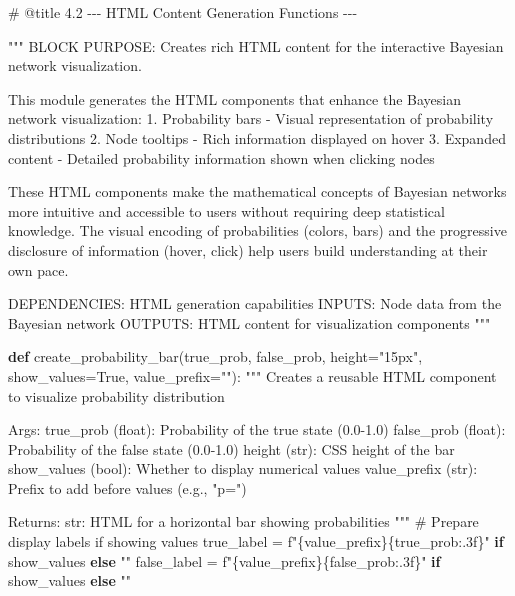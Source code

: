 \documentclass[
  11pt,
  letterpaper,
]{book}
\newenvironment{Shaded}{\begin{snugshade}}{\end{snugshade}}
\newcommand{\CommentTok}[1]{\textcolor[rgb]{0.37,0.37,0.37}{#1}}
\newcommand{\ControlFlowTok}[1]{\textcolor[rgb]{0.00,0.23,0.31}{\textbf{#1}}}
\newcommand{\KeywordTok}[1]{\textcolor[rgb]{0.00,0.23,0.31}{\textbf{#1}}}
\newcommand{\NormalTok}[1]{\textcolor[rgb]{0.00,0.23,0.31}{#1}}
\newcommand{\OperatorTok}[1]{\textcolor[rgb]{0.37,0.37,0.37}{#1}}
\newcommand{\SpecialCharTok}[1]{\textcolor[rgb]{0.37,0.37,0.37}{#1}}
\newcommand{\SpecialStringTok}[1]{\textcolor[rgb]{0.13,0.47,0.30}{#1}}
\newcommand{\StringTok}[1]{\textcolor[rgb]{0.13,0.47,0.30}{#1}}
\newcommand{\VariableTok}[1]{\textcolor[rgb]{0.07,0.07,0.07}{#1}}
\begin{document}
\begin{Shaded}
\begin{Highlighting}[]
\CommentTok{\# @title 4.2 {-}{-}{-} HTML Content Generation Functions {-}{-}{-}}

\CommentTok{"""}
\CommentTok{BLOCK PURPOSE: Creates rich HTML content for the interactive Bayesian network visualization.}

\CommentTok{This module generates the HTML components that enhance the Bayesian network visualization:}
\CommentTok{1. Probability bars {-} Visual representation of probability distributions}
\CommentTok{2. Node tooltips {-} Rich information displayed on hover}
\CommentTok{3. Expanded content {-} Detailed probability information shown when clicking nodes}

\CommentTok{These HTML components make the mathematical concepts of Bayesian networks more}
\CommentTok{intuitive and accessible to users without requiring deep statistical knowledge.}
\CommentTok{The visual encoding of probabilities (colors, bars) and the progressive disclosure}
\CommentTok{of information (hover, click) help users build understanding at their own pace.}

\CommentTok{DEPENDENCIES: HTML generation capabilities}
\CommentTok{INPUTS: Node data from the Bayesian network}
\CommentTok{OUTPUTS: HTML content for visualization components}
\CommentTok{"""}

\KeywordTok{def}\NormalTok{ create\_probability\_bar(true\_prob, false\_prob, height}\OperatorTok{=}\StringTok{"15px"}\NormalTok{, show\_values}\OperatorTok{=}\VariableTok{True}\NormalTok{, value\_prefix}\OperatorTok{=}\StringTok{""}\NormalTok{):}
    \CommentTok{"""}
\CommentTok{    Creates a reusable HTML component to visualize probability distribution}

\CommentTok{    Args:}
\CommentTok{        true\_prob (float): Probability of the true state (0.0{-}1.0)}
\CommentTok{        false\_prob (float): Probability of the false state (0.0{-}1.0)}
\CommentTok{        height (str): CSS height of the bar}
\CommentTok{        show\_values (bool): Whether to display numerical values}
\CommentTok{        value\_prefix (str): Prefix to add before values (e.g., "p=")}

\CommentTok{    Returns:}
\CommentTok{        str: HTML for a horizontal bar showing probabilities}
\CommentTok{    """}
    \CommentTok{\# Prepare display labels if showing values}
\NormalTok{    true\_label }\OperatorTok{=} \SpecialStringTok{f"}\SpecialCharTok{\{}\NormalTok{value\_prefix}\SpecialCharTok{\}\{}\NormalTok{true\_prob}\SpecialCharTok{:.3f\}}\SpecialStringTok{"} \ControlFlowTok{if}\NormalTok{ show\_values }\ControlFlowTok{else} \StringTok{""}
\NormalTok{    false\_label }\OperatorTok{=} \SpecialStringTok{f"}\SpecialCharTok{\{}\NormalTok{value\_prefix}\SpecialCharTok{\}\{}\NormalTok{false\_prob}\SpecialCharTok{:.3f\}}\SpecialStringTok{"} \ControlFlowTok{if}\NormalTok{ show\_values }\ControlFlowTok{else} \StringTok{""}


\end{Highlighting}
\end{Shaded}
\end{document}
